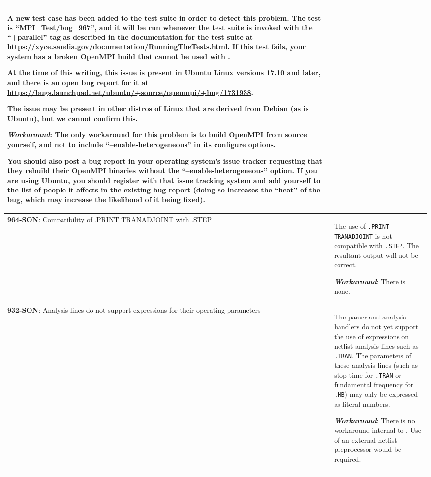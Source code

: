 {\begin{longtable}[h] {>{\raggedright\small}m{2in}|>{\raggedright\let\\\tabularnewline\small}m{3.5in}}
A new test case has been added to the \Xyce{} test suite in order to
detect this problem.  The test is ``MPI\_Test/bug\_967'', and it will
be run whenever the test suite is invoked with the ``+parallel'' tag
as described in the documentation for the test suite
at \url{https://xyce.sandia.gov/documentation/RunningTheTests.html}.
If this test fails, your system has a broken OpenMPI build that cannot
be used with \Xyce{}.

At the time of this writing, this issue is present in Ubuntu Linux
versions 17.10 and later, and there is an open bug report for it
at \url{https://bugs.launchpad.net/ubuntu/+source/openmpi/+bug/1731938}.

The issue may be present in other distros of Linux that are derived
from Debian (as is Ubuntu), but we cannot confirm this.

\textbf{\textit{Workaround}}:
The only workaround for this problem is to build OpenMPI from source
yourself, and not to include ``--enable-heterogeneous'' in its
configure options.

You should also post a bug report in your operating system's issue
tracker requesting that they rebuild their OpenMPI binaries without
the ``--enable-heterogeneous'' option.  If you are using Ubuntu, you
should register with that issue tracking system and add yourself to
the list of people it affects in the existing bug report (doing so
increases the ``heat'' of the bug, which may increase the likelihood
of it being fixed).

\\ \hline

\textbf{964-SON}: Compatibility of .PRINT TRANADJOINT with .STEP & The use of
\texttt{.PRINT TRANADJOINT} is not compatible with \texttt{.STEP}.  The
resultant \Xyce{} output will not be correct.

\textbf{\textit{Workaround}}: There is none.
\\ \hline

\textbf{932-SON}: Analysis lines do not support expressions for their
operating parameters & The \Xyce{} parser and analysis handlers do not
yet support the use of expressions on netlist analysis lines such
as \texttt{.TRAN}.  The parameters of these analysis lines (such as
stop time for \texttt{.TRAN} or fundamental frequency
for \texttt{.HB}) may only be expressed as literal numbers.

\textbf{\textit{Workaround}}: There is no workaround internal to \Xyce{}.
Use of an external netlist preprocessor would be required. \\ \hline


\end{longtable}}
